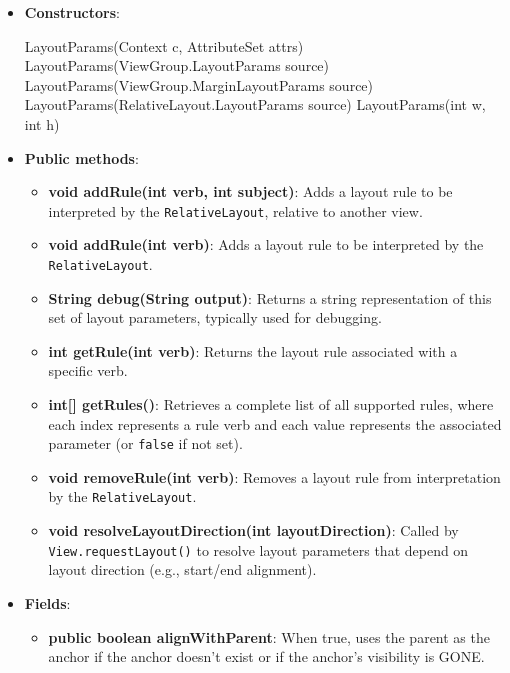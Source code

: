 \documentclass{report}
\begin{document}
\begin{itemize}
        \item \textbf{Constructors}:
            \bigbreak \noindent 
            \begin{javacode}
                LayoutParams(Context c, AttributeSet attrs)
                LayoutParams(ViewGroup.LayoutParams source)
                LayoutParams(ViewGroup.MarginLayoutParams source)
                LayoutParams(RelativeLayout.LayoutParams source)
                LayoutParams(int w, int h)
            \end{javacode}
        \item \textbf{Public methods}:
            \begin{itemize}
                \item \textbf{void addRule(int verb, int subject)}: Adds a layout rule to be interpreted by the \texttt{RelativeLayout}, relative to another view.
                \item \textbf{void addRule(int verb)}: Adds a layout rule to be interpreted by the \texttt{RelativeLayout}.
                \item \textbf{String debug(String output)}: Returns a string representation of this set of layout parameters, typically used for debugging.
                \item \textbf{int getRule(int verb)}: Returns the layout rule associated with a specific verb.
                \item \textbf{int[] getRules()}: Retrieves a complete list of all supported rules, where each index represents a rule verb and each value represents the associated parameter (or \texttt{false} if not set).
                \item \textbf{void removeRule(int verb)}: Removes a layout rule from interpretation by the \texttt{RelativeLayout}.
                \item \textbf{void resolveLayoutDirection(int layoutDirection)}: Called by \texttt{View.requestLayout()} to resolve layout parameters that depend on layout direction (e.g., start/end alignment).
            \end{itemize}
        \item \textbf{Fields}:
            \begin{itemize}
                \item \textbf{public boolean	alignWithParent}: When true, uses the parent as the anchor if the anchor doesn't exist or if the anchor's visibility is GONE.
            \end{itemize}

    \end{itemize}
    
\end{document}
